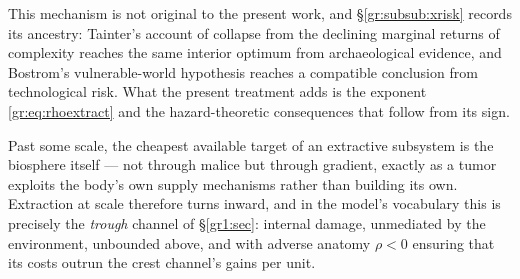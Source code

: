 \documentclass[11pt]{article}
\numberwithin{equation}{section}
\theoremstyle{plain}
\theoremstyle{definition}
\theoremstyle{remark}
\begin{document}
\noindent This mechanism is not original to the present work, and
\S\ref{gr:subsub:xrisk} records its ancestry: Tainter's account of
collapse from the declining marginal returns of complexity
\cite{Tainter88} reaches the same interior optimum from archaeological
evidence, and Bostrom's vulnerable-world hypothesis \cite{Bostrom19}
reaches a compatible conclusion from technological risk. What the
present treatment adds is the exponent \eqref{gr:eq:rhoextract} and the
hazard-theoretic consequences that follow from its sign.

Past some scale, the cheapest available target of an extractive
subsystem is the biosphere itself --- not through malice but through
gradient, exactly as a tumor exploits the body's own supply mechanisms
rather than building its own. Extraction at scale therefore turns
inward, and in the model's vocabulary this is precisely the
\emph{trough} channel of \S\ref{gr1:sec}: internal damage, unmediated by the
environment, unbounded above, and with adverse anatomy $\rho<0$ ensuring
that its costs outrun the crest channel's gains per unit.
\end{document}

